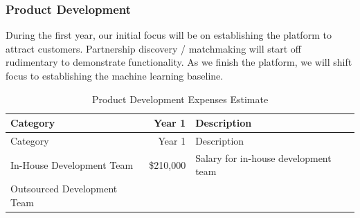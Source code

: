 \documentclass[11pt,openany]{book}
\begin{document}
\hypertarget{product-development}{%
\subsubsection{Product Development}\label{product-development}}

During the first year, our initial focus will be on establishing the
platform to attract customers. Partnership discovery / matchmaking will
start off rudimentary to demonstrate functionality. As we finish the
platform, we will shift focus to establishing the machine learning
baseline.

\begin{longtable}[]{@{}lrl@{}}
\caption{Product Development Expenses Estimate}\tabularnewline
\toprule
\begin{minipage}[b]{0.41\columnwidth}\raggedright
Category\strut
\end{minipage} & \begin{minipage}[b]{0.11\columnwidth}\raggedleft
Year 1\strut
\end{minipage} & \begin{minipage}[b]{0.39\columnwidth}\raggedright
Description\strut
\end{minipage}\tabularnewline
\midrule
\endfirsthead
\toprule
\begin{minipage}[b]{0.41\columnwidth}\raggedright
Category\strut
\end{minipage} & \begin{minipage}[b]{0.11\columnwidth}\raggedleft
Year 1\strut
\end{minipage} & \begin{minipage}[b]{0.39\columnwidth}\raggedright
Description\strut
\end{minipage}\tabularnewline
\midrule
\endhead
\begin{minipage}[t]{0.41\columnwidth}\raggedright
In-House Development Team\strut
\end{minipage} & \begin{minipage}[t]{0.11\columnwidth}\raggedleft
\$210,000\strut
\end{minipage} & \begin{minipage}[t]{0.39\columnwidth}\raggedright
Salary for in-house development team\strut
\end{minipage}\tabularnewline
\begin{minipage}[t]{0.41\columnwidth}\raggedright
Outsourced Development Team\strut
\end{minipage} & \begin{minipage}[t]{0.11\columnwidth}\raggedleft

\end{minipage}
\end{longtable}
\end{document}
